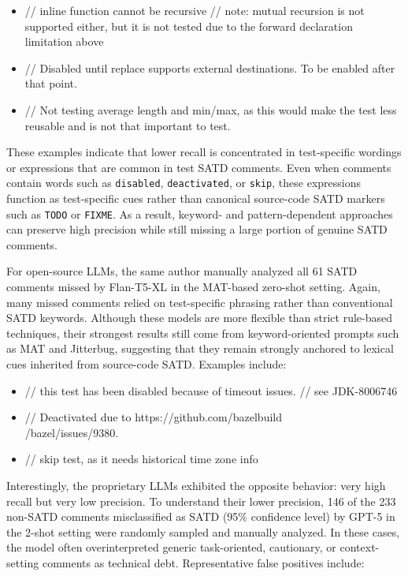 \begin{itemize}[itemsep=-2pt]
    \item \textcolor{commentColor}{// inline function cannot be recursive
// note: mutual recursion is not supported either, but it is not tested due to the forward declaration limitation above}
    \item \textcolor{commentColor}{// Disabled until replace supports external destinations. To be enabled after that point.}
    \item \textcolor{commentColor}{// Not testing average length and min/max, as this would make the test less reusable and is not that important to test.}
\end{itemize}

These examples indicate that lower recall is concentrated in test-specific wordings or expressions that are common in test SATD comments. Even when comments contain words such as \texttt{disabled}, \texttt{deactivated}, or \texttt{skip}, these expressions function as test-specific cues rather than canonical source-code SATD markers such as \texttt{TODO} or \texttt{FIXME}. As a result, keyword- and pattern-dependent approaches can preserve high precision while still missing a large portion of genuine SATD comments.

For open-source LLMs, the same author manually analyzed all 61 SATD comments missed by Flan-T5-XL in the MAT-based zero-shot setting. Again, many missed comments relied on test-specific phrasing rather than conventional SATD keywords. Although these models are more flexible than strict rule-based techniques, their strongest results still come from keyword-oriented prompts such as MAT and Jitterbug, suggesting that they remain strongly anchored to lexical cues inherited from source-code SATD. Examples include:

\begin{itemize}[itemsep=-2pt]
    \item \textcolor{commentColor}{// this test has been disabled because of timeout issues.
// see JDK-8006746}
    \item \textcolor{commentColor}{// Deactivated due to https://github.com/bazelbuild\\/bazel/issues/9380.}
    \item \textcolor{commentColor}{// skip test, as it needs historical time zone info}
\end{itemize}


Interestingly, the proprietary LLMs exhibited the opposite behavior: very high recall but very low precision. To understand their lower precision, 146 of the 233 non-SATD comments misclassified as SATD (95\% confidence level) by GPT-5 in the 2-shot setting were randomly sampled and manually analyzed. In these cases, the model often overinterpreted generic task-oriented, cautionary, or context-setting comments as technical debt. Representative false positives include:


